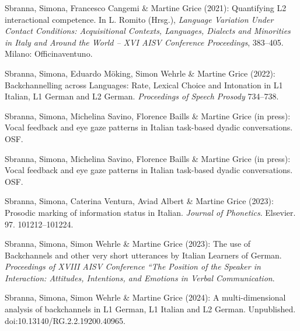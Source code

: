 \begin{styleBibliography}
Sbranna, Simona, Francesco Cangemi \& Martine Grice (2021): Quantifying L2 interactional competence. In L. Romito (Hrsg.), \textit{Language Variation Under Contact Conditions: Acquisitional Contexts, Languages, Dialects and Minorities in Italy and Around the World – XVI AISV Conference Proceedings}, 383–405. Milano: Officinaventuno.
\end{styleBibliography}

\begin{styleBibliography}
Sbranna, Simona, Eduardo Möking, Simon Wehrle \& Martine Grice (2022): Backchannelling across Languages: Rate, Lexical Choice and Intonation in L1 Italian, L1 German and L2 German. \textit{Proceedings of Speech Prosody} 734–738.
\end{styleBibliography}

\begin{styleBibliography}
Sbranna, Simona, Michelina Savino, Florence Baills \& Martine Grice (in press): Vocal feedback and eye gaze patterns in Italian task-based dyadic conversations. OSF.
\end{styleBibliography}

\begin{styleBibliography}
Sbranna, Simona, Michelina Savino, Florence Baills \& Martine Grice (in press): Vocal feedback and eye gaze patterns in Italian task-based dyadic conversations. OSF.
\end{styleBibliography}

\begin{styleBibliography}
Sbranna, Simona, Caterina Ventura, Aviad Albert \& Martine Grice (2023): Prosodic marking of information status in Italian. \textit{Journal of Phonetics}. Elsevier. 97. 101212–101224.
\end{styleBibliography}

\begin{styleBibliography}
Sbranna, Simona, Simon Wehrle \& Martine Grice (2023): The use of Backchannels and other very short utterances by Italian Learners of German. \textit{Proceedings of XVIII AISV Conference “The Position of the Speaker in Interaction: Attitudes, Intentions, and Emotions in Verbal Communication}.
\end{styleBibliography}

\begin{styleBibliography}
Sbranna, Simona, Simon Wehrle \& Martine Grice (2024): A multi-dimensional analysis of backchannels in L1 German, L1 Italian and L2 German. Unpublished. doi:10.13140/RG.2.2.19200.40965.
\end{styleBibliography}

